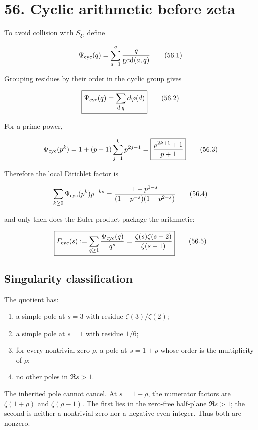 \documentclass[
  11pt,
]{book}
\providecommand{\tightlist}{%
  \setlength{\itemsep}{0pt}\setlength{\parskip}{0pt}}
\begin{document}
\section{56. Cyclic arithmetic before
zeta}\label{cyclic-arithmetic-before-zeta}

To avoid collision with \(S_\xi\), define

\[
\Psi_{\rm cyc}(q)
=\sum_{a=1}^{q}\frac{q}{\gcd(a,q)}
\tag{56.1}
\]

Grouping residues by their order in the cyclic group gives

\[
\boxed{
\Psi_{\rm cyc}(q)
=\sum_{d\mid q}d\varphi(d)}
\tag{56.2}
\]

For a prime power,

\[
\Psi_{\rm cyc}(p^k)
=1+(p-1)\sum_{j=1}^{k}p^{2j-1}
=\boxed{\frac{p^{2k+1}+1}{p+1}}
\tag{56.3}
\]

Therefore the local Dirichlet factor is

\[
\sum_{k\ge0}\Psi_{\rm cyc}(p^k)p^{-ks}
=\frac{1-p^{1-s}}
{(1-p^{-s})(1-p^{2-s})}
\tag{56.4}
\]

and only then does the Euler product package the arithmetic:

\[
\boxed{
F_{\rm cyc}(s)
:=\sum_{q\ge1}\frac{\Psi_{\rm cyc}(q)}{q^s}
=\frac{\zeta(s)\zeta(s-2)}{\zeta(s-1)}}
\tag{56.5}
\]

\subsection{Singularity
classification}\label{singularity-classification}

The quotient has:

\begin{enumerate}
\def\labelenumi{\arabic{enumi}.}
\tightlist
\item
  a simple pole at \(s=3\) with residue \(\zeta(3)/\zeta(2)\);
\item
  a simple pole at \(s=1\) with residue \(1/6\);
\item
  for every nontrivial zero \(\rho\), a pole at \(s=1+\rho\) whose order
  is the multiplicity of \(\rho\);
\item
  no other poles in \(\Re s>1\).
\end{enumerate}

The inherited pole cannot cancel. At \(s=1+\rho\), the numerator factors
are \(\zeta(1+\rho)\) and \(\zeta(\rho-1)\). The first lies in the
zero-free half-plane \(\Re s>1\); the second is neither a nontrivial
zero nor a negative even integer. Thus both are nonzero.
\end{document}
